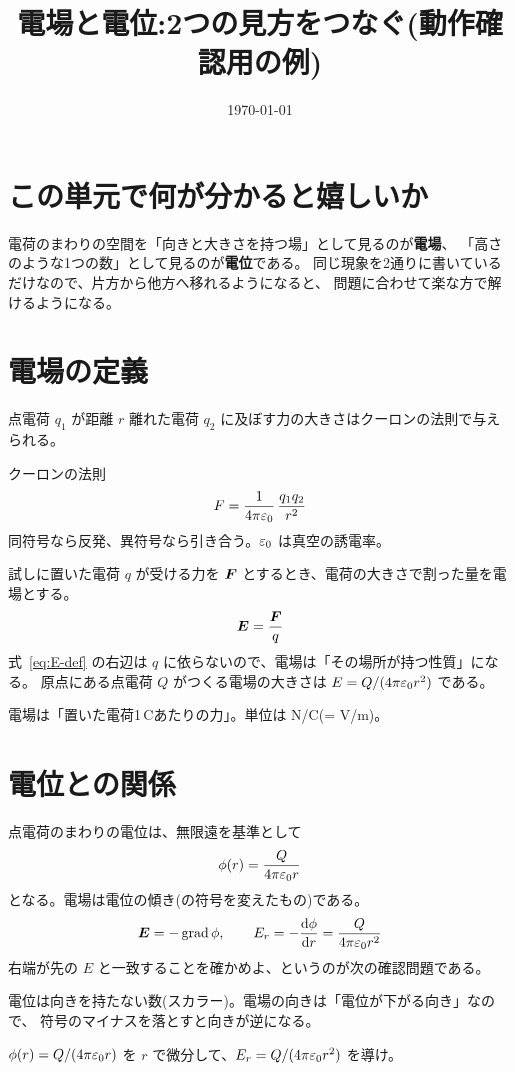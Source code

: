 \documentclass[a4paper,11pt]{ltjsarticle}
\title{電場と電位:2つの見方をつなぐ(動作確認用の例)}
\author{}
\date{\today}
\begin{document}
\maketitle

\section{この単元で何が分かると嬉しいか}

電荷のまわりの空間を「向きと大きさを持つ場」として見るのが\textbf{電場}、
「高さのような1つの数」として見るのが\textbf{電位}である。
同じ現象を2通りに書いているだけなので、片方から他方へ移れるようになると、
問題に合わせて楽な方で解けるようになる。

\section{電場の定義}

点電荷 $q_1$ が距離 $r$ 離れた電荷 $q_2$ に及ぼす力の大きさはクーロンの法則で与えられる。

\begin{fact}{クーロンの法則}
  \[
    F = \frac{1}{4\pi\varepsilon_0}\,\frac{q_1 q_2}{r^2}
  \]
  同符号なら反発、異符号なら引き合う。$\varepsilon_0$ は真空の誘電率。
\end{fact}

試しに置いた電荷 $q$ が受ける力を $\bm{F}$ とするとき、電荷の大きさで割った量を電場とする。
\begin{equation}
  \bm{E} = \frac{\bm{F}}{q}
  \label{eq:E-def}
\end{equation}
式~\eqref{eq:E-def} の右辺は $q$ に依らないので、電場は「その場所が持つ性質」になる。
原点にある点電荷 $Q$ がつくる電場の大きさは $E = Q/(4\pi\varepsilon_0 r^2)$ である。

\begin{point}
  電場は「置いた電荷1\,\unit{C}あたりの力」。単位は \unit{N/C}(= \unit{V/m})。
\end{point}

\section{電位との関係}

点電荷のまわりの電位は、無限遠を基準として
\begin{equation}
  \phi(r) = \frac{Q}{4\pi\varepsilon_0 r}
\end{equation}
となる。電場は電位の傾き(の符号を変えたもの)である。
\begin{equation}
  \bm{E} = -\operatorname{grad}\phi, \qquad
  E_r = -\frac{\mathrm{d} \phi}{\mathrm{d} r} = \frac{Q}{4\pi\varepsilon_0 r^2}
\end{equation}
右端が先の $E$ と一致することを確かめよ、というのが次の確認問題である。

\begin{caution}
  電位は向きを持たない数(スカラー)。電場の向きは「電位が下がる向き」なので、
  符号のマイナスを落とすと向きが逆になる。
\end{caution}

\begin{question}
  $\phi(r) = Q/(4\pi\varepsilon_0 r)$ を $r$ で微分して、$E_r = Q/(4\pi\varepsilon_0 r^2)$ を導け。
\end{question}
\end{document}

